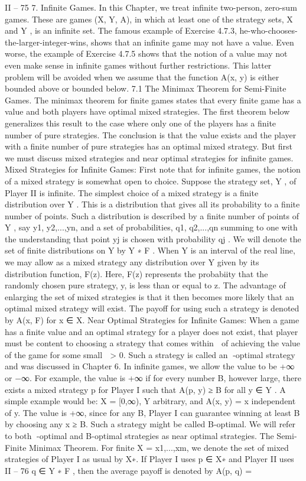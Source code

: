 II – 75
7. Infinite Games.
In this Chapter, we treat infinite two-person, zero-sum games. These are games
(X, Y, A), in which at least one of the strategy sets, X and Y , is an infinite set. The
famous example of Exercise 4.7.3, he-who-chooses-the-larger-integer-wins, shows that an
infinite game may not have a value. Even worse, the example of Exercise 4.7.5 shows
that the notion of a value may not even make sense in infinite games without further
restrictions. This latter problem will be avoided when we assume that the function A(x, y)
is either bounded above or bounded below.
7.1 The Minimax Theorem for Semi-Finite Games. The minimax theorem for
finite games states that every finite game has a value and both players have optimal mixed
strategies. The first theorem below generalizes this result to the case where only one of
the players has a finite number of pure strategies. The conclusion is that the value exists
and the player with a finite number of pure strategies has an optimal mixed strategy. But
first we must discuss mixed strategies and near optimal strategies for infinite games.
Mixed Strategies for Infinite Games: First note that for infinite games, the notion
of a mixed strategy is somewhat open to choice. Suppose the strategy set, Y , of Player
II is infinite. The simplest choice of a mixed strategy is a finite distribution over Y .
This is a distribution that gives all its probability to a finite number of points. Such a
distribution is described by a finite number of points of Y , say y1, y2,...,yn, and a set of
probabilities, q1, q2,...,qn summing to one with the understanding that point yj is chosen
with probability qj . We will denote the set of finite distributions on Y by Y ∗
F .
When Y is an interval of the real line, we may allow as a mixed strategy any distribution
over Y given by its distribution function, F(z). Here, F(z) represents the probabiity
that the randomly chosen pure strategy, y, is less than or equal to z. The advantage of
enlarging the set of mixed strategies is that it then becomes more likely that an optimal
mixed strategy will exist. The payoff for using such a strategy is denoted by A(x, F) for
x ∈ X.
Near Optimal Strategies for Infinite Games: When a game has a finite value and
an optimal strategy for a player does not exist, that player must be content to choosing
a strategy that comes within  of achieving the value of the game for some small  > 0.
Such a strategy is called an -optimal strategy and was discussed in Chapter 6.
In infinite games, we allow the value to be +∞ or −∞. For example, the value is +∞
if for every number B, however large, there exists a mixed strategy p for Player I such
that A(p, y) ≥ B for all y ∈ Y . A simple example would be: X = [0,∞), Y arbitrary, and
A(x, y) = x independent of y. The value is +∞, since for any B, Player I can guarantee
winning at least B by choosing any x ≥ B. Such a strategy might be called B-optimal.
We will refer to both -optimal and B-optimal strategies as near optimal strategies.
The Semi-Finite Minimax Theorem. For finite X = {x1,...,xm}, we denote the set
of mixed strategies of Player I as usual by X∗. If Player I uses p ∈ X∗ and Player II uses
II – 76
q ∈ Y ∗
F , then the average payoff is denoted by
A(p, q) = 

